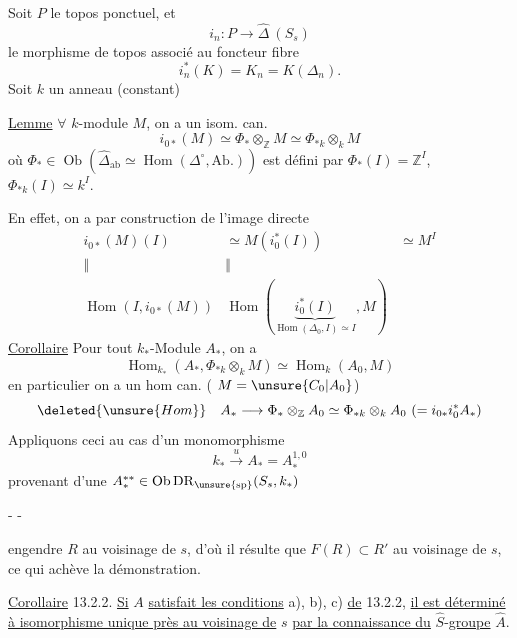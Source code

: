 Soit $P$ le topos ponctuel, et
\[
i_n:P\longrightarrow\widehat\Delta\ (S_s)
\]
le morphisme de topos associé au foncteur fibre
\[
i_n^*(K)=K_n=K(\Delta_n).
\]
Soit $k$ un anneau (constant)

\uline{Lemme} $\forall$ $k$-module $M$, on a un isom. can.
\[
i_{0*}(M)\simeq\Phi_*\otimes_{\mathbb Z}M\simeq\Phi_{*k}\otimes_k M
\]
où $\Phi_*\in\operatorname{Ob}(\widehat\Delta_{\mathrm{ab}}\simeq\operatorname{Hom}(\Delta^\circ,\mathrm{Ab.}))$ est défini par $\Phi_*(I)=\mathbb Z^I$,  $\Phi_{*k}(I)\simeq k^I$.

En effet, on a par construction de l'image directe
\[
\begin{array}{ccc}
i_{0*}(M)(I)&\simeq M(i_0^*(I))&\simeq M^I\\
\Vert&\Vert&\\
\operatorname{Hom}(I,i_{0*}(M))&\operatorname{Hom}(\underbrace{i_0^*(I)}_{\operatorname{Hom}(\Delta_0,I)\simeq I},M)&
\end{array}
\]
\uline{Corollaire} Pour tout $k_*$-Module $A_*$, on a
\[
\operatorname{Hom}_{k_*}(A_*,\Phi_{*k}\otimes_k M)\simeq\operatorname{Hom}_k(A_0,M)
\]
en particulier on a un hom can. ( $M=\unsure{C_0|A_0}$)
\[
\deleted{\unsure{Hom}}\quad A_*\longrightarrow\Phi_*\otimes_{\mathbb Z}A_0\simeq\Phi_{*k}\otimes_k A_0\ (=i_{0*}i_0^*A_*)
\]
Appliquons ceci au cas d'un monomorphisme
\[
k_*\xrightarrow{u} A_*=A_*^{1,0}
\]
provenant d'une $A_*^{**}\in\operatorname{Ob}\mathrm{DR}_{\unsure{\mathrm{sp}}}(S_s,k_*)$


\begin{center}-  -\end{center}
engendre $R$ au voisinage de $s$, d'où il résulte que $F(R)\subset R'$ au voisinage de $s$, ce qui achève la démonstration.

\uline{Corollaire} 13.2.2. \uline{Si} $A$ \uline{satisfait les conditions} a), b), c) \uline{de} 13.2.2, \uline{il est déterminé à isomorphisme unique près au voisinage de} $s$ \uline{par la connaissance du} $\widehat S$-\uline{groupe} $\widehat A$.

